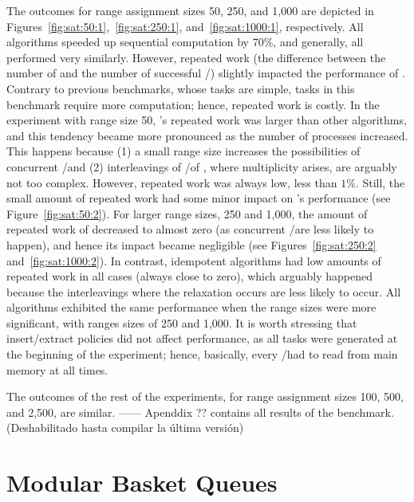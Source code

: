 The outcomes for range assignment sizes 50, 250, and 1,000 are depicted in Figures~\ref{fig:sat:50:1},~\ref{fig:sat:250:1}, and~\ref{fig:sat:1000:1}, respectively. All algorithms speeded up sequential computation by 70\%, and generally, all performed very similarly. However, repeated work (the difference between the number of \Puts and the number of successful \Takes/\Steals) slightly impacted the performance of \NCWSM. Contrary to previous benchmarks, whose tasks are simple, tasks in this benchmark require more computation; hence, repeated work is costly. In the experiment with range size 50, \NCWSM's repeated work was larger than other algorithms, and this tendency became more pronounced as the number of processes increased. This happens because (1) a small range size increases the possibilities of concurrent \Puts/\Takes and (2) interleavings of \Puts/\Takes of \NCWSM, where multiplicity arises, are arguably not too complex. However, repeated work was always low, less than $1\%$. Still, the small amount of repeated work had some minor impact on \NCWSM's performance (see Figure~\ref{fig:sat:50:2}). For larger range sizes, 250 and 1,000, the amount of repeated work of \NCWSM decreased to almost zero (as concurrent \Puts/\Takes are less likely to happen), and hence its impact became negligible (see Figures~\ref{fig:sat:250:2} and~\ref{fig:sat:1000:2}). In contrast, idempotent algorithms had low amounts of repeated work in all cases (always close to zero), which arguably happened because the interleavings where the relaxation occurs are less likely to occur. All algorithms exhibited the same performance when the range sizes were more significant, with ranges sizes of 250 and 1,000. It is worth stressing that insert/extract policies did not affect performance, as all tasks were generated at the beginning of the experiment; hence, basically, every \Take/\Steal had to read from main memory at all times.

The outcomes of the rest of the experiments, for range assignment sizes 100, 500, and 2,500, are similar. ------ Apenddix ?? %
contains all results of the benchmark. (Deshabilitado hasta compilar la última versión)



\section{\label{sec:results-modular-basket-queue}Modular Basket Queues}

